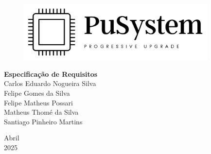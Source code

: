 \documentclass[a5paper, 12pt]{article}
\begin{document}

\begin{titlepage}
	\begin{center}
	
	\begin{figure}[!ht]
	\centering
	\includegraphics[width=10cm]{Logo Transparente Preto.png} \\ 
    \end{figure}

        
		\vspace{115pt}
        \textbf{\Huge{Especificação de Requisitos}}\\
        
		\vspace{115pt}
        Carlos Eduardo Nogueira Silva \\
        Felipe Gomes da Silva \\
        Felipe Matheus Possari \\
        Matheus Thomé da Silva\\ 
        Santiago Pinheiro Martins \\
	\end{center}
	
	
	\vspace{1cm}
	\begin{center}
		\vspace{\fill}
		 Abril \\
		 2025
			\end{center}
\end{titlepage}




\newpage
\thispagestyle{empty}
\tableofcontents

\newpage
\pagestyle{fancy}

\fancyhead[L]{\thepage}
\fancyhead[C]{\nouppercase{\leftmark}}
\fancyfoot[R]{}
\fancyfoot[L]{}
\setlength\headheight{26pt}
\end{document}
